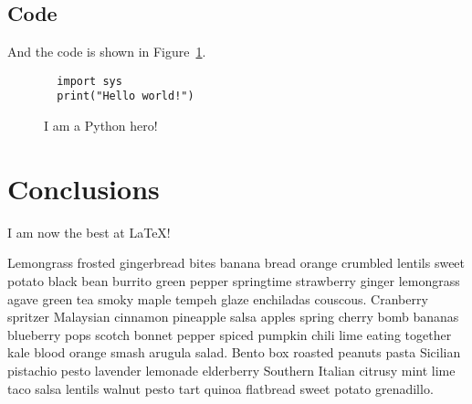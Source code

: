 \documentclass[a4paper,11pt]{scrartcl}
\begin{document}
\subsection{Code}

And the code is shown in Figure~\ref{fig:code}.
\begin{figure}
\begin{lstlisting}
  import sys 
  print("Hello world!")
\end{lstlisting}
\caption{I am a Python hero!}%
\label{fig:code}
\end{figure}


%
\section{Conclusions}

I am now the best at \LaTeX!

Lemongrass frosted gingerbread bites banana bread orange crumbled lentils sweet potato black bean burrito green pepper springtime strawberry ginger lemongrass agave green tea smoky maple tempeh glaze enchiladas couscous. Cranberry spritzer Malaysian cinnamon pineapple salsa apples spring cherry bomb bananas blueberry pops scotch bonnet pepper spiced pumpkin chili lime eating together kale blood orange smash arugula salad. Bento box roasted peanuts pasta Sicilian pistachio pesto lavender lemonade elderberry Southern Italian citrusy mint lime taco salsa lentils walnut pesto tart quinoa flatbread sweet potato grenadillo.




\end{document}
